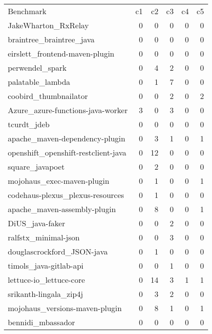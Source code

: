 \begin{table}[]
    \begin{tabular}{lrrrrr}
        Benchmark                            & c1 & c2 & c3 & c4 & c5 \\
        JakeWharton\_RxRelay                 & 0  & 0  & 0  & 0  & 0  \\
        braintree\_braintree\_java           & 0  & 0  & 0  & 0  & 0  \\
        eirslett\_frontend-maven-plugin      & 0  & 0  & 0  & 0  & 0  \\
        perwendel\_spark                     & 0  & 4  & 2  & 0  & 0  \\
        palatable\_lambda                    & 0  & 1  & 7  & 0  & 0  \\
        coobird\_thumbnailator               & 0  & 0  & 2  & 0  & 2  \\
        Azure\_azure-functions-java-worker   & 3  & 0  & 3  & 0  & 0  \\
        tcurdt\_jdeb                         & 0  & 0  & 0  & 0  & 0  \\
        apache\_maven-dependency-plugin      & 0  & 3  & 1  & 0  & 1  \\
        openshift\_openshift-restclient-java & 0  & 12 & 0  & 0  & 0  \\
        square\_javapoet                     & 0  & 2  & 0  & 0  & 0  \\
        mojohaus\_exec-maven-plugin          & 0  & 1  & 0  & 0  & 1  \\
        codehaus-plexus\_plexus-resources    & 0  & 1  & 0  & 0  & 0  \\
        apache\_maven-assembly-plugin        & 0  & 8  & 0  & 0  & 1  \\
        DiUS\_java-faker                     & 0  & 0  & 2  & 0  & 0  \\
        ralfstx\_minimal-json                & 0  & 0  & 3  & 0  & 0  \\
        douglascrockford\_JSON-java          & 0  & 1  & 0  & 0  & 0  \\
        timols\_java-gitlab-api              & 0  & 0  & 1  & 0  & 0  \\
        lettuce-io\_lettuce-core             & 0  & 14 & 3  & 1  & 1  \\
        srikanth-lingala\_zip4j              & 0  & 3  & 2  & 0  & 0  \\
        mojohaus\_versions-maven-plugin      & 0  & 8  & 1  & 0  & 1  \\
        bennidi\_mbassador                   & 0  & 0  & 0  & 0  & 0
    \end{tabular}
\end{table}